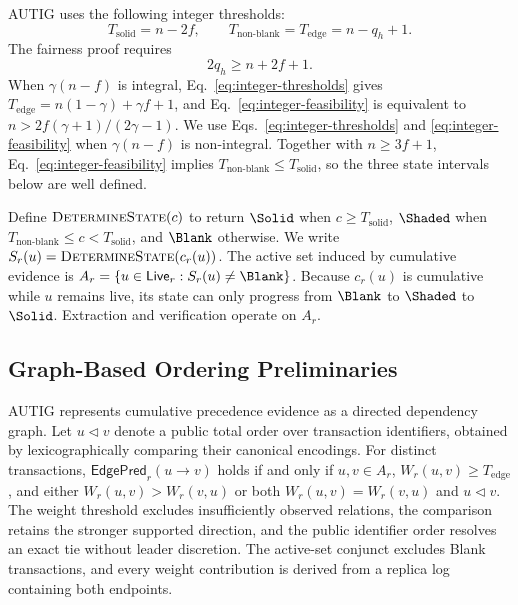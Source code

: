 AUTIG uses the following integer thresholds:
\begin{equation}
 T_{\mathrm{solid}}=n-2f,
 \qquad
 T_{\mathrm{non\mbox{-}blank}}=T_{\mathrm{edge}}
   =n-q_h+1.
 \label{eq:integer-thresholds}
\end{equation}
The fairness proof requires
\begin{equation}
 2q_h\ge n+2f+1.
 \label{eq:integer-feasibility}
\end{equation}
When $\gamma(n-f)$ is integral, Eq.~\eqref{eq:integer-thresholds} gives
$T_{\mathrm{edge}}=n(1-\gamma)+\gamma f+1$, and
Eq.~\eqref{eq:integer-feasibility} is equivalent to
$n>2f(\gamma+1)/(2\gamma-1)$.
We use Eqs.~\eqref{eq:integer-thresholds} and
\eqref{eq:integer-feasibility} when $\gamma(n-f)$ is non-integral.
Together with $n\ge3f+1$, Eq.~\eqref{eq:integer-feasibility} implies
$T_{\mathrm{non\mbox{-}blank}}\le T_{\mathrm{solid}}$, so the three state
intervals below are well defined.

Define $\textsc{DetermineState}(c)$ to return $\Solid$ when
$c\ge T_{\mathrm{solid}}$, $\Shaded$ when
$T_{\mathrm{non\mbox{-}blank}}\le c<T_{\mathrm{solid}}$, and $\Blank$
otherwise.  We write $S_r(u)=\textsc{DetermineState}(c_r(u))$.  The active set
induced by cumulative evidence is
$A_r=\{u\in\mathsf{Live}_r:S_r(u)\ne\Blank\}$.
Because $c_r(u)$ is cumulative while $u$ remains live, its state can only
progress from $\Blank$ to $\Shaded$ to $\Solid$.  Extraction and verification
operate on $A_r$.

\subsection{Graph-Based Ordering Preliminaries}
\label{sec:graph-preliminaries}

AUTIG represents cumulative precedence evidence as a directed dependency
graph.  Let $u\triangleleft v$ denote a public total order over transaction
identifiers, obtained by lexicographically comparing their canonical encodings.
For distinct transactions, $\mathsf{EdgePred}_r(u\to v)$ holds if and only if
$u,v\in A_r$, $W_r(u,v)\ge T_{\mathrm{edge}}$, and either
$W_r(u,v)>W_r(v,u)$ or both $W_r(u,v)=W_r(v,u)$ and $u\triangleleft v$.
The weight threshold excludes insufficiently observed relations, the comparison
retains the stronger supported direction, and the public identifier order
resolves an exact tie without leader discretion.  The active-set conjunct
excludes Blank transactions, and every weight contribution is derived from a
replica log containing both endpoints.

